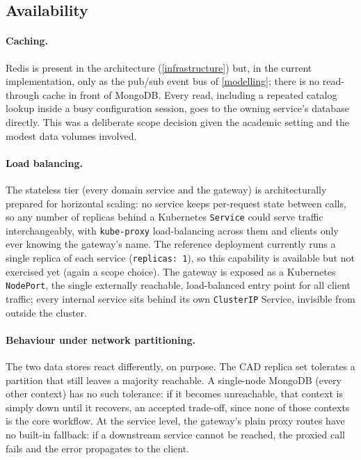 \subsection{Availability}\label{availability}

\paragraph{Caching.} Redis is present in the architecture (\cref{infrastructure})
but, in the current implementation, only as the pub/sub event bus of
\cref{modelling}; there is no read-through cache in front of MongoDB.
Every read, including a repeated catalog lookup
inside a busy configuration session, goes to the owning service's database
directly. This was a deliberate scope decision given the academic setting and
the modest data volumes involved.

\paragraph{Load balancing.} The stateless tier (every domain service and the
gateway) is architecturally prepared for horizontal scaling: no service keeps
per-request state between calls, so any
number of replicas behind a Kubernetes \texttt{Service} could serve traffic
interchangeably, with \texttt{kube-proxy} load-balancing across them and
clients only ever knowing the gateway's name. The
reference deployment currently runs a single replica of each service
(\texttt{replicas: 1}), so this capability is available but not exercised yet
(again a scope choice).
The gateway is exposed as a Kubernetes \texttt{NodePort}, the single
externally reachable, load-balanced entry point for all client traffic; every
internal service sits behind its own \texttt{ClusterIP} Service, invisible
from outside the cluster.

\paragraph{Behaviour under network partitioning.} The two data stores react
differently, on purpose. The CAD replica set tolerates a partition that still
leaves a majority reachable. A single-node MongoDB (every other context) has no
such tolerance: if it becomes unreachable, that context is simply down until
it recovers, an accepted trade-off, since none of those contexts is the
core workflow. At the service level, the gateway's plain proxy routes have no
built-in fallback: if a downstream service cannot be reached, the proxied
call fails and the error propagates to the client.

